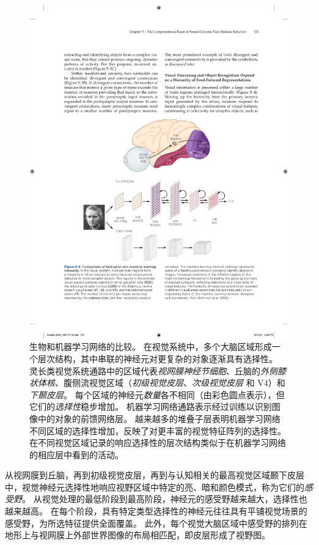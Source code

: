 \begin{figure}[htbp]
	\centering
	\includegraphics[width=1.0\linewidth]{chap05/fig_5_4}
	\caption{生物和机器学习网络的比较。
		在视觉系统中，多个大脑区域形成一个层次结构，其中串联的神经元对更复杂的对象逐渐具有选择性。
		灵长类视觉系统通路中的区域代表\textit{视网膜神经节细胞}、丘脑的\textit{外侧膝状体核}、腹侧流视觉区域（\textit{初级视觉皮层}、\textit{次级视觉皮层} 和 V4）和\textit{下颞皮层}。
		每个区域的神经元\textit{数量}各不相同（由彩色圆点表示），但它们的\textit{选择性}稳步增加。
		机器学习网络通路表示经过训练以识别图像中的对象的前馈网络层。
		越来越多的堆叠子层表明机器学习网络不同区域的选择性增加，反映了对更丰富的视觉特征阵列的选择性。
		在不同视觉区域记录的响应选择性的层次结构类似于在机器学习网络的相应层中看到的活动\cite{schrimpf2018brain}。}
	\label{fig:5_4}
\end{figure}



从视网膜到丘脑，再到初级视觉皮层，再到与认知相关的最高视觉区域颞下皮层中，视觉神经元选择性地响应视野区域中特定的亮、暗和颜色模式，称为它们的\textit{感受野}。
从视觉处理的最低阶段到最高阶段，神经元的感受野越来越大，选择性也越来越高。
在每个阶段，具有特定类型选择性的神经元往往具有平铺视觉场景的感受野，为所选特征提供全面覆盖。
此外，每个视觉大脑区域中感受野的排列在地形上与视网膜上外部世界图像的布局相匹配，即皮层形成了视野图。


